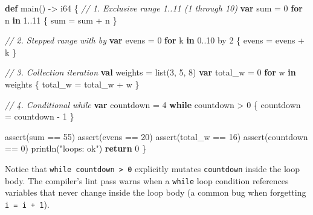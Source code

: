 \documentclass[
  english,
  oneside]{book}
\newenvironment{Shaded}{\begin{snugshade}}{\end{snugshade}}
\newcommand{\CommentTok}[1]{\textcolor[rgb]{0.42,0.60,0.33}{\textit{#1}}}
\newcommand{\ControlFlowTok}[1]{\textcolor[rgb]{0.77,0.53,0.75}{\textbf{#1}}}
\newcommand{\DataTypeTok}[1]{\textcolor[rgb]{0.31,0.79,0.69}{#1}}
\newcommand{\DecValTok}[1]{\textcolor[rgb]{0.71,0.81,0.66}{#1}}
\newcommand{\FunctionTok}[1]{\textcolor[rgb]{0.86,0.86,0.67}{#1}}
\newcommand{\KeywordTok}[1]{\textcolor[rgb]{0.34,0.61,0.84}{\textbf{#1}}}
\newcommand{\NormalTok}[1]{\textcolor[rgb]{0.83,0.83,0.83}{#1}}
\newcommand{\OperatorTok}[1]{\textcolor[rgb]{0.83,0.83,0.83}{#1}}
\newcommand{\StringTok}[1]{\textcolor[rgb]{0.81,0.57,0.47}{#1}}
\begin{document}
\begin{Shaded}
\begin{Highlighting}[]
\KeywordTok{def}\NormalTok{ main() }\OperatorTok{{-}\textgreater{}} \DataTypeTok{i64}\NormalTok{ \{}
    \CommentTok{// 1. Exclusive range 1..11 (1 through 10)}
    \KeywordTok{var}\NormalTok{ sum }\OperatorTok{=} \DecValTok{0}
    \ControlFlowTok{for}\NormalTok{ n }\ControlFlowTok{in} \DecValTok{1}\OperatorTok{..}\DecValTok{11}\NormalTok{ \{}
\NormalTok{        sum }\OperatorTok{=}\NormalTok{ sum }\OperatorTok{+}\NormalTok{ n}
\NormalTok{    \}}

    \CommentTok{// 2. Stepped range with \textasciigrave{}by\textasciigrave{}}
    \KeywordTok{var}\NormalTok{ evens }\OperatorTok{=} \DecValTok{0}
    \ControlFlowTok{for}\NormalTok{ k }\ControlFlowTok{in} \DecValTok{0}\OperatorTok{..}\DecValTok{10}\NormalTok{ by }\DecValTok{2}\NormalTok{ \{}
\NormalTok{        evens }\OperatorTok{=}\NormalTok{ evens }\OperatorTok{+}\NormalTok{ k}
\NormalTok{    \}}

    \CommentTok{// 3. Collection iteration}
    \KeywordTok{val}\NormalTok{ weights }\OperatorTok{=} \DataTypeTok{list}\NormalTok{(}\DecValTok{3}\NormalTok{, }\DecValTok{5}\NormalTok{, }\DecValTok{8}\NormalTok{)}
    \KeywordTok{var}\NormalTok{ total\_w }\OperatorTok{=} \DecValTok{0}
    \ControlFlowTok{for}\NormalTok{ w }\ControlFlowTok{in}\NormalTok{ weights \{}
\NormalTok{        total\_w }\OperatorTok{=}\NormalTok{ total\_w }\OperatorTok{+}\NormalTok{ w}
\NormalTok{    \}}

    \CommentTok{// 4. Conditional while}
    \KeywordTok{var}\NormalTok{ countdown }\OperatorTok{=} \DecValTok{4}
    \ControlFlowTok{while}\NormalTok{ countdown }\OperatorTok{\textgreater{}} \DecValTok{0}\NormalTok{ \{}
\NormalTok{        countdown }\OperatorTok{=}\NormalTok{ countdown }\OperatorTok{{-}} \DecValTok{1}
\NormalTok{    \}}

    \FunctionTok{assert}\NormalTok{(sum }\OperatorTok{==} \DecValTok{55}\NormalTok{)}
    \FunctionTok{assert}\NormalTok{(evens }\OperatorTok{==} \DecValTok{20}\NormalTok{)}
    \FunctionTok{assert}\NormalTok{(total\_w }\OperatorTok{==} \DecValTok{16}\NormalTok{)}
    \FunctionTok{assert}\NormalTok{(countdown }\OperatorTok{==} \DecValTok{0}\NormalTok{)}
\NormalTok{    println(}\StringTok{"loops: ok"}\NormalTok{)}
    \ControlFlowTok{return} \DecValTok{0}
\NormalTok{\}}
\end{Highlighting}
\end{Shaded}

Notice that \texttt{while\ countdown\ \textgreater{}\ 0} explicitly
mutates \texttt{countdown} inside the loop body. The compiler's lint
pass warns when a \texttt{while} loop condition references variables
that never change inside the loop body (a common bug when forgetting
\texttt{i\ =\ i\ +\ 1}).
\end{document}
